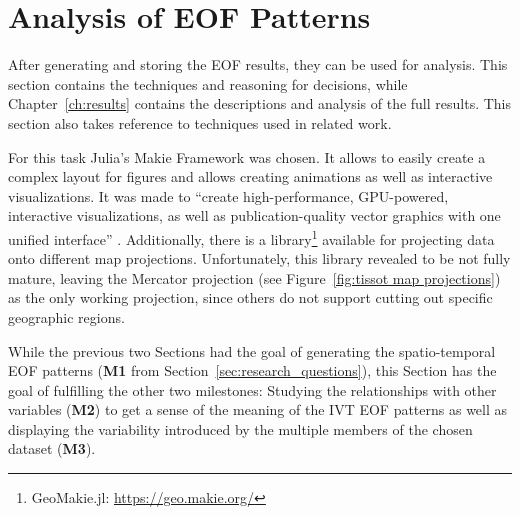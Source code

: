 \section{Analysis of EOF Patterns}
\label{sec:vis_analysis}

After generating and storing the EOF results, they can be used for analysis. 
This section contains the techniques and reasoning for decisions, while Chapter~\ref{ch:results} contains the descriptions and analysis of the full results. 
This section also takes reference to techniques used in related work. 

For this task Julia's Makie Framework \cite{danisch_makiejl_2021} was chosen. 
It allows to easily create a complex layout for figures and allows creating animations as well as interactive visualizations. 
It was made to \enquote{create high-performance, GPU-powered, interactive visualizations, as well as publication-quality vector graphics with one unified interface} \cite{danisch_makiejl_2021}. 
Additionally, there is a library\footnote{GeoMakie.jl: \url{https://geo.makie.org/}} available for projecting data onto different map projections. 
Unfortunately, this library revealed to be not fully mature, leaving the Mercator projection (see Figure~\ref{fig:tissot map projections}) as the only working projection, since others do not support cutting out specific geographic regions.  


While the previous two Sections had the goal of generating the spatio-temporal EOF patterns (\textbf{M1} from Section~\ref{sec:research_questions}), this Section has the goal of fulfilling the other two milestones:  
Studying the relationships with other variables (\textbf{M2}) to get a sense of the meaning of the IVT EOF patterns as well as displaying the variability introduced by the multiple members of the chosen dataset (\textbf{M3}). 


